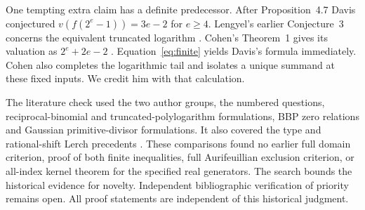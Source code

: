 \documentclass[11pt]{article}
\begin{document}
One tempting extra claim has a definite predecessor. After Proposition~4.7 Davis conjectured $v(f(2^e-1))=3e-2$ for $e\ge4$. Lengyel's earlier Conjecture~3 concerns the equivalent truncated logarithm \cite{Lengyel}. Cohen's Theorem~1 gives its valuation as $2^e+2e-2$ \cite{Cohen}. Equation~\eqref{eq:finite} yields Davis's formula immediately. Cohen also completes the logarithmic tail and isolates a unique summand at these fixed inputs. We credit him with that calculation.

The literature check used the two author groups, the numbered questions, reciprocal-binomial and truncated-polylogarithm formulations, BBP zero relations and Gaussian primitive-divisor formulations. It also covered the type and rational-shift Lerch precedents \cite{Kedlaya,DHK}. These comparisons found no earlier full domain criterion, proof of both finite inequalities, full Aurifeuillian exclusion criterion, or all-index kernel theorem for the specified real generators. The search bounds the historical evidence for novelty. Independent bibliographic verification of priority remains open. All proof statements are independent of this historical judgment.
\end{document}
